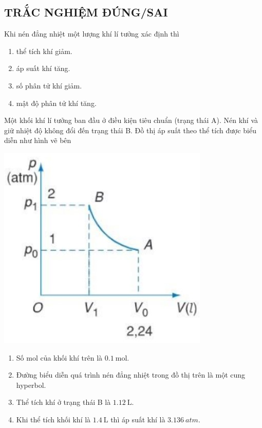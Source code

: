\subsection{TRẮC NGHIỆM ĐÚNG/SAI}
\setcounter{ex}{0}
\begin{ex}
Khi nén đẳng nhiệt một lượng khí lí tưởng xác định thì	
\begin{enumerate}[label=\alph*)]
	\item thể tích khí giảm.
	\item áp suất khí tăng.
	\item số phân tử khí giảm.
	\item mật độ phân tử khí tăng.
\end{enumerate}
\end{ex}
\begin{ex}
	Một khối khí lí tưởng ban đầu ở điều kiện tiêu chuẩn (trạng thái A). Nén khí và giữ nhiệt độ không đổi đến trạng thái B. Đồ thị áp suất theo thể tích được biểu diễn như hình vẽ bên
	\begin{center}
		\includegraphics[width=0.35\linewidth]{figs/VN12-Y24-PH-SYL-010P-11}
	\end{center}
	\begin{enumerate}[label=\alph*)]
		\item Số mol của khối khí trên là $\SI{0.1}{\mole}$.
		\item Đường biểu diễn quá trình nén đẳng nhiệt trong đồ thị trên là một cung hyperbol.
		\item Thể tích khí ở trạng thái B là $\SI{1.12}{\liter}$.
		\item Khi thể tích khối khí là $\SI{1.4}{\liter}$ thì áp suất khí là $\SI{3.136}{atm}$.
	\end{enumerate}
	
\end{ex}
